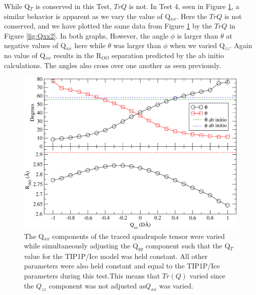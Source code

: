 While Q$_T$ is conserved in this Test, $TrQ$ is not. In Test 4, seen in Figure
\ref{fig:Qxx}, a similar behavior is apparent as we vary the value of Q$_{xx}$.
Here the $TrQ$ is not conserved, and we have plotted the same data from 
Figure \ref{fig:Qxx} by the $TrQ$ in Figure \ref{fig:Qxx2}. In both graphs,
However, the angle $\phi$ is larger
than $\theta$ at negative values of Q$_{xx}$ here while $\theta$ was larger 
than $\phi$ when we varied Q$_{zz}$. Again no value of Q$_{xx}$ results in the
R$_{OO}$ separation predicted by the ab initio calculations. The angles
also cross over one another as seen previously.  

\begin{figure}[h!]
\includegraphics[width = \linewidth]{Figures/Test4_plot.pdf}
\caption{\label{fig:Qxx} The Q$_{xx}$ components of the traced quadrupole tensor were varied while simultaneously adjusting the Q$_{yy}$ component such that the Q$_T$ value for the TIP1P/Ice model was held constant. All other parameters were also held constant and equal to the TIP1P/Ice parameters during this test.This means that $Tr(Q)$ varied since the $Q_{zz}$ component was not adjusted as$Q_{xx}$ was varied.}
\end{figure}


